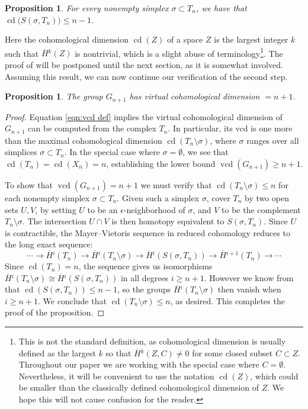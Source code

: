 \documentclass[12pt, letterpaper]{article}
\newcommand{\cdim}{\operatorname{cd}}
\newcommand{\vcd}{\operatorname{vcd}}
\theoremstyle{plain}
\newtheorem{prop}[thm]{Proposition}
\theoremstyle{definition}
\begin{document}
\begin{prop}\label{prop:cd-spherical-nbhds}
    For every nonempty simplex $\sigma \subset T_n$, we have that $\cdim \bigl(S(\sigma, T_n)\bigr)\leq n-1$.
\end{prop} 

Here the cohomological dimension $\cdim(Z)$ of a space $Z$ is the largest integer $k$ such that $\overline{H}{}^{k}(Z)$ is nontrivial, which is a slight abuse of terminology\footnote{This is not the standard definition, as cohomological dimension is usually defined as the largest $k$ so that $\overline{H}{}^{k}(Z, C) \neq 0$ for some closed subset $C\subset Z$. Throughout our paper we are working with the special case where $C=\emptyset$. Nevertheless, it will be convenient to use the notation $\cdim(Z)$, which could be smaller than the classically defined cohomological dimension of $Z$. We hope this will not cause confusion for the reader.}. The proof of  will be postponed until the next section, as it is somewhat involved. Assuming this result, we can now continue our verification of the second step.

\begin{prop}\label{prop:vcd-exact}
    The group $G_{n+1}$ has virtual cohomological dimension $= n+1$.
\end{prop}

\begin{proof}
Equation \eqref{eqn:vcd def} implies the virtual cohomological dimension of $G_{n+1}$ can be computed from the complex $T_n$. In particular, its vcd is one more than the maximal cohomological dimension $\cdim(T_n\setminus \sigma)$, where $\sigma$ ranges over all simplices $\sigma \subset T_n$. In the special case where $\sigma = \emptyset$, we see that $\cdim(T_n)=\cdim(X_n) = n$, establishing the lower bound $\vcd(G_{n+1}) \geq n+1$.

To show that $\vcd(G_{n+1})= n+1$ we must verify that $\cdim(T_n \setminus \sigma)\leq n$ for each nonempty simplex $\sigma \subset T_n$. Given such a simplex $\sigma$, cover $T_n$ by two open sets $U,V$, by setting $U$ to be an $\epsilon$-neighborhood of $\sigma$, and $V$ to be the complement $T_n \setminus \sigma$. The intersection $U\cap V$ is then homotopy equivalent to $S(\sigma, T_n)$. Since $U$ is contractible, the Mayer--Vietoris sequence in reduced cohomology reduces to the long exact sequence:
    \[ \cdots \longrightarrow \overline{H}{}^i(T_n) \longrightarrow \overline{H}{}^i(T_n\setminus \sigma) \longrightarrow \overline{H}{}^i(S(\sigma, T_n)) \longrightarrow \overline{H}{}^{i+1}(T_n) \longrightarrow \cdots \]
Since $\cdim(T_n)=n$, the sequence gives us isomorphisms $\overline{H}{}^i(T_n\setminus \sigma)
\cong \overline{H}{}^i(S(\sigma, T_n))$ in all degrees $i\geq n+1$. However we know from  that $\cdim(S(\sigma, T_n))\leq n-1$, so the groups $\overline{H}{}^i(T_n\setminus \sigma)$ then vanish when $i\geq n+1$. We conclude that $\cdim(T_n\setminus \sigma)\leq n$, as desired. This completes the proof of the proposition.
\end{proof}
\end{document}
